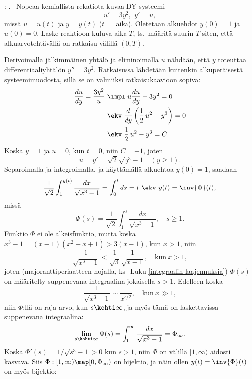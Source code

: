 \begin{Exa}: .  \ Nopeaa kemiallista rekatiota
kuvaa DY-systeemi
\[
u'=3y^2,\,\ y'=u,
\]
missä $u=u(t)$ ja $y=y(t)$ ($t=$ aika). Oletetaan alkuehdot $y(0)=1$ ja $u(0)=0$. Laske
reaktioon kuluva aika $T$, ts.\ määritä suurin $T$ siten, että alkuarvotehtävällä on ratkaisu
välillä $(0,T)$.
\end{Exa}
\ratk Derivoimalla jälkimmäinen yhtälö ja eliminoimalla $u$ nähdään, että $y$ toteuttaa
differentiaaliyhtälön $y''=3y^2$. Ratkaisussa lähdetään kuitenkin alkuperäisestä 
systeemimuodosta, sillä se on valmiiksi ratkaisukaavioon sopiva:
\begin{align*}
\frac{du}{dy}=\frac{3y^2}{u}\ &\impl\ u\frac{du}{dy}-3y^2=0 \\
                              &\ekv\ \frac{d}{dy}\left(\frac{1}{2}\,u^2-y^3\right)=0 \\
                              &\ekv\ \frac{1}{2}\,u^2-y^3=C.
\end{align*}
Koska $y=1$ ja $u=0$, kun $t=0$, niin $C=-1$, joten
\[
u=y'=\sqrt{2}\sqrt{y^3-1}\quad (y\geq 1).
\]
Separoimalla ja integroimalla, ja käyttämällä alkuehtoa $y(0)=1$, saadaan
\[
\frac{1}{\sqrt{2}}\int_1^{y(t)}\frac{dx}{\sqrt{x^3-1}}=\int_{0}^t dx 
                                                      =t\ \ekv\ y(t)=\inv{\Phi}(t),
\]
missä
\[
\Phi(s)=\frac{1}{\sqrt{2}}\int_1^s\frac{dx}{\sqrt{x^3-1}},\quad s\geq 1.
\]
Funktio $\Phi$ ei ole alkeisfunktio, mutta koska $x^3-1=(x-1)(x^2+x+1)>3(x-1)$, kun $x>1$,
niin
\[
\frac{1}{\sqrt{x^3-1}} < \frac{1}{\sqrt{3}}\frac{1}{\sqrt{x-1}}, \quad \text{kun}\ x>1,
\]
joten (majoranttiperiaatteen nojalla, ks.\ Luku \ref{integraalin laajennuksia}) $\Phi(s)$ on
määritelty suppenevana integraalina jokaisella $s>1$. Edelleen koska
\[
\frac{1}{\sqrt{x^3-1}} \sim \frac{1}{x^{3/2}}, \quad \text{kun}\ x \gg 1,
\]
niin $\Phi$:llä on raja-arvo, kun $s\kohti\infty$, ja myös tämä on laskettavissa suppenevana
integraalina:
\[
\lim_{s\kohti\infty} \Phi(s) =\int_1^\infty \frac{dx}{\sqrt{x^3-1}}=\Phi_\infty.
\]
Koska $\Phi'(s)=1/\sqrt{s^3-1}>0$ kun $s>1$, niin $\Phi$ on välillä $[1,\infty)$ aidosti
kasvava. Siis $\Phi:[1,\infty) \map [0,\Phi_\infty)$ on bijektio, ja näin ollen 
$y(t)=\inv{\Phi}(t)$ on myös bijektio:
